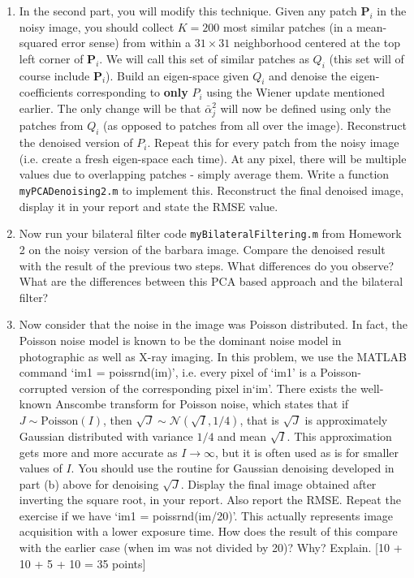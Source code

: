 \documentclass[11pt]{article}
\begin{document}
\begin{enumerate}
\begin{enumerate}
\item In the second part, you will modify this technique. Given any patch $\mathbf{P}_i$ in the noisy image, you should collect $K = 200$ most similar patches (in a mean-squared error sense) from within a $31 \times 31$ neighborhood centered at the top left corner of $\mathbf{P}_i$. We will call this set of similar patches as $Q_i$ (this set will of course include $\mathbf{P}_i$). Build an eigen-space given $Q_i$ and denoise the eigen-coefficients corresponding to \textbf{only} $P_i$ using the Wiener update mentioned earlier. The only change will be that $\bar{\alpha}^2_j$ will now be defined using only the patches from $Q_i$ (as opposed to patches from all over the image). Reconstruct the denoised version of $P_i$. Repeat this for every patch from the noisy image (i.e. create a fresh eigen-space each time). At any pixel, there will be multiple values due to overlapping patches - simply average them. Write a function \texttt{myPCADenoising2.m} to implement this. Reconstruct the final denoised image, display it in your report and state the RMSE value. 
\item Now run your bilateral filter code \texttt{myBilateralFiltering.m} from Homework 2 on the noisy version of the barbara image. Compare the denoised result with the result of the previous two steps. What differences do you observe? What are the differences between this PCA based approach and the bilateral filter? 

\item Now consider that the noise in the image was Poisson distributed. In fact, the Poisson noise model is known to be the dominant noise model in photographic as well as X-ray imaging. In this problem, we use the MATLAB command `im1 = poissrnd(im)', i.e. every pixel of `im1' is a Poisson-corrupted version of the corresponding pixel in`im'. There exists the well-known Anscombe transform for Poisson noise, which states that if $J \sim \textrm{Poisson}(I)$, then $\sqrt{J} \sim \mathcal{N}(\sqrt{I},1/4)$, that is $\sqrt{J}$ is approximately Gaussian distributed with variance $1/4$ and mean $\sqrt{I}$. This approximation gets more and more accurate as $I \rightarrow \infty$, but it is often used as is for smaller values of $I$. You should use the routine for Gaussian denoising developed in part (b) above for denoising $\sqrt{J}$. Display the final image obtained after inverting the square root, in your report. Also report the RMSE. Repeat the exercise if we have `im1 = poissrnd(im/20)'. This actually represents image acquisition with a lower exposure time. How does the result of this compare with the earlier case (when im was not divided by 20)? Why? Explain. 
\textsf{[10 + 10 + 5 + 10 = 35 points]}
\end{enumerate}


\end{enumerate}
\end{document}
